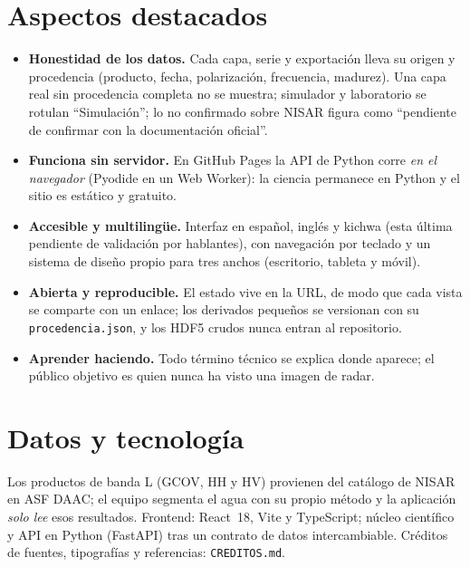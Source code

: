\documentclass[11pt,a4paper]{article}
\begin{document}
\section*{Aspectos destacados}
\begin{itemize}
\item \textbf{Honestidad de los datos.} Cada capa, serie y exportación lleva su origen y procedencia (producto, fecha, polarización, frecuencia, madurez). Una capa real sin procedencia completa no se muestra; simulador y laboratorio se rotulan ``Simulación''; lo no confirmado sobre NISAR figura como ``pendiente de confirmar con la documentación oficial''.
\item \textbf{Funciona sin servidor.} En GitHub Pages la API de Python corre \emph{en el navegador} (Pyodide en un Web Worker): la ciencia permanece en Python y el sitio es estático y gratuito.
\item \textbf{Accesible y multilingüe.} Interfaz en español, inglés y kichwa (esta última pendiente de validación por hablantes), con navegación por teclado y un sistema de diseño propio para tres anchos (escritorio, tableta y móvil).
\item \textbf{Abierta y reproducible.} El estado vive en la URL, de modo que cada vista se comparte con un enlace; los derivados pequeños se versionan con su \texttt{procedencia.json}, y los HDF5 crudos nunca entran al repositorio.
\item \textbf{Aprender haciendo.} Todo término técnico se explica donde aparece; el público objetivo es quien nunca ha visto una imagen de radar.
\end{itemize}

\section*{Datos y tecnología}
Los productos de banda L (GCOV, HH y HV) provienen del catálogo de NISAR en ASF DAAC; el equipo segmenta el agua con su propio método y la aplicación \emph{solo lee} esos resultados. Frontend: React~18, Vite y TypeScript; núcleo científico y API en Python (FastAPI) tras un contrato de datos intercambiable. Créditos de fuentes, tipografías y referencias: \texttt{CREDITOS.md}.
\end{document}
